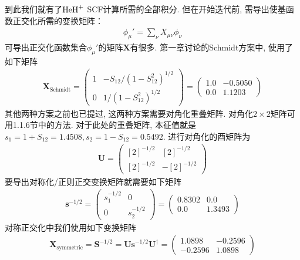 到此我们就有了$\mathrm{HeH}^+$ SCF计算所需的全部积分. 
但在开始迭代前, 
需导出使基函数正交化所需的变换矩阵：
\begin{align}
	\phi_\mu'=\sum_\nu X_{\mu\nu}\phi_\nu
\end{align}
可导出正交化函数集合$\phi_\mu'$的矩阵$\mathbf{X}$有很多. 
第一章讨论的Schmidt方案中, 
使用了如下矩阵
\begin{align}
	\mathbf{X}_\mathrm{Schmidt} = 
	\begin{pmatrix}
		1 & -S_{12}/(1-S_{12}^2)^{1/2} \\
		0 & 1/(1-S_{12}^2)^{1/2}
	\end{pmatrix}=
	\begin{pmatrix}
		1.0 & -0.5050 \\
		0.0 & 1.1203
	\end{pmatrix}
\end{align}
其他两种方案之前也已提过, 
这两种方案需要对角化重叠矩阵. 
对角化$2\times2$矩阵可用1.1.6节中的方法. 
对于此处的重叠矩阵, 
本征值就是$s_1=1+S_{12}=1.4508,s_2=1-S_{12}=0.5492$. 
进行对角化的酉矩阵为
\begin{align}
	\mathbf{U}=
	\begin{pmatrix}
		[2]^{-1/2}&[2]^{-1/2}\\
		[2]^{-1/2}&-[2]^{-1/2}
	\end{pmatrix}
\end{align}
要导出对称化/正则正交变换矩阵就需要如下矩阵
\begin{align}
	\mathbf{s}^{-1/2}=
	\begin{pmatrix}
		s_1^{-1/2}&0\\0&s_2^{-1/2}
	\end{pmatrix}=
	\begin{pmatrix}
		0.8302&0.0\\0.0&1.3493
	\end{pmatrix}
\end{align}
对称正交化中我们使用如下变换矩阵
\begin{align}
	\mathbf{X}_\mathrm{symmetric} = \mathbf{S}^{-1/2}=\mathbf{Us}^{-1/2}\mathbf{U^\dagger}=
	\begin{pmatrix}
		1.0898&-0.2596\\-0.2596&1.0898
	\end{pmatrix}
\end{align}
